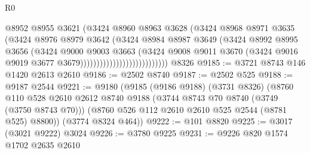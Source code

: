 \begin{lexlean}{R0}
\begin{coremodule}
                                          @8952
                                          @8955
                                          @3621
                                          (@3424
                                            @8960
                                            @8963
                                            @3628
                                            (@3424
                                              @8968
                                              @8971
                                              @3635
                                              (@3424
                                                @8976
                                                @8979
                                                @3642
                                                (@3424
                                                  @8984
                                                  @8987
                                                  @3649
                                                  (@3424
                                                    @8992
                                                    @8995
                                                    @3656
                                                    (@3424
                                                      @9000
                                                      @9003
                                                      @3663
                                                      (@3424
                                                        @9008
                                                        @9011
                                                        @3670
                                                        (@3424
                                                          @9016
                                                          @9019
                                                          @3677
                                                          @3679)))))))))))))))))))))))))))
    @8326
@9185 := @3721 @8743 @146 @1420 @2613 @2610
@9186 := @2502 @8740
@9187 := @2502 @525
@9188 := @9187 @2544
@9221 := @9180
    (@9185
      (@9186 @9188)
      (@3731 @8326)
      (@8760
        @110
        @528
        @2610
        @2612
        @8740
        @9188
        (@3744 @8743 @70 @8740 (@3749 (@3750 @8743 @70)))
        (@8760 @526 @112 @2610 @2610 @525 @2544 (@8781 @525) @8800))
      (@3774 @8324 @464))
@9222 := @101 @8820
@9225 := @3017 (@3021 @9222) @3024
@9226 := @3780 @9225
@9231 := @9226 @820 @1574 @1702 @2635 @2610

\end{coremodule}
\end{lexlean}

